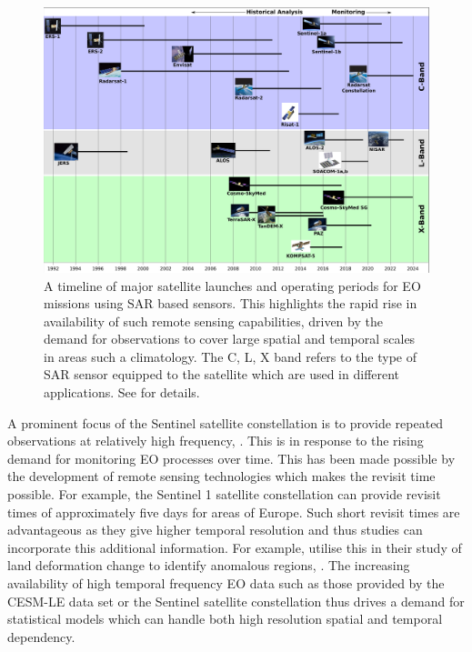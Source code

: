 \begin{figure}[htbp!] 
	\centering    
	\includegraphics[width=1.0\textwidth]{Sensors}
	\caption[Timeline of major EO satellites]{A timeline of major satellite launches and operating periods for EO missions using SAR based sensors. This highlights the rapid rise in availability of such remote sensing capabilities, driven by the demand for observations to cover large spatial and temporal scales in areas such a climatology. The C, L, X band refers to the type of SAR sensor equipped to the satellite which are used in different applications. See \citep{oliver_understanding_2004} for details.}
	\label{fig:sar_timeline}
\end{figure}

A prominent focus of the Sentinel satellite constellation is to provide repeated observations at relatively high frequency, \cite{aschbacher_european_2012}.
This is in response to the rising demand for monitoring EO processes over time.
This has been made possible by the development of remote sensing technologies which makes the revisit time possible.
For example, the Sentinel 1 satellite constellation can provide revisit times of approximately five days for areas of Europe.
Such short revisit times are advantageous as they give higher temporal resolution and thus studies can incorporate this additional information.
For example, \citeauthor{raspini_continuous_2018} utilise this in their study of land deformation change to identify anomalous regions, \citep{raspini_continuous_2018}.
The increasing availability of high temporal frequency EO data such as those provided by the CESM-LE data set or the Sentinel satellite constellation thus drives a demand for statistical models which can handle both high resolution spatial and temporal dependency.  

